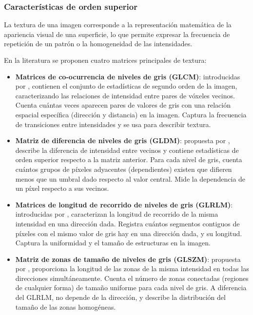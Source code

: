 \subsubsection{Características de orden superior}

La textura de una imagen corresponde a la representación matemática de la apariencia visual de una superficie, lo que permite expresar la frecuencia de repetición de un patrón o la homogeneidad de las intensidades.

En la literatura se proponen cuatro matrices principales de textura:

\begin{itemize}
    \item \textbf{Matrices de co-ocurrencia de niveles de gris (GLCM)}: introducidas por \cite{haralick2007textural}, contienen el conjunto de estadísticas de segundo orden de la imagen, caracterizando las relaciones de intensidad entre pares de vóxeles vecinos. Cuenta cuántas veces aparecen pares de valores de gris con una relación espacial específica (dirección y distancia) en la imagen. Captura la frecuencia de transiciones entre intensidades y se usa para describir textura.
    
    \item \textbf{Matriz de diferencia de niveles de gris (GLDM)}: propuesta por \cite{amadasun1989textural}, describe la diferencia de intensidad entre vecinos y contiene estadísticas de orden superior respecto a la matriz anterior. Para cada nivel de gris, cuenta cuántos grupos de píxeles adyacentes (dependientes) existen que difieren menos que un umbral dado respecto al valor central. Mide la dependencia de un píxel respecto a sus vecinos.
    
    \item \textbf{Matrices de longitud de recorrido de niveles de gris (GLRLM)}: introducidas por \cite{galloway1974texture}, caracterizan la longitud de recorrido de la misma intensidad en una dirección dada. Registra cuántos segmentos contiguos de píxeles con el mismo valor de gris hay en una dirección dada, y su longitud. Captura la uniformidad y el tamaño de estructuras en la imagen.
    
    \item \textbf{Matriz de zonas de tamaño de niveles de gris (GLSZM)}: propuesta por \cite{thibault2013advanced}, proporciona la longitud de las zonas de la misma intensidad en todas las direcciones simultáneamente. Cuenta el número de zonas conectadas (regiones de cualquier forma) de tamaño uniforme para cada nivel de gris. A diferencia del GLRLM, no depende de la dirección, y describe la distribución del tamaño de las zonas homogéneas.
\end{itemize}

